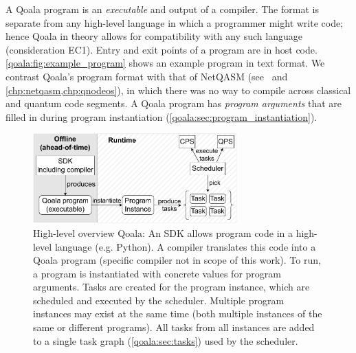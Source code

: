 A Qoala program is an \textit{executable} and output of a compiler.
The format is separate from any high-level language in which a programmer might write code; hence Qoala in theory allows for compatibility with any such language (consideration EC1).
Entry and exit points of a program are in host code.
\cref{qoala:fig:example_program} shows an example program in text format.
We contrast Qoala's program format with that of NetQASM (see~\cite{dahlberg2022netqasm} and \cref{chp:netqasm,chp:qnodeos}), in which there was no way to compile across classical and quantum code segments.
A Qoala program has \textit{program arguments} that are filled in during program instantiation (\cref{qoala:sec:program_instantiation}).


\begin{figure}
    \centering
    \includegraphics[width=0.7\textwidth]{figures/qoala/runtime_overview.pdf}
    \caption{High-level overview Qoala: An SDK allows program code in a high-level language (e.g. Python).
    A compiler translates this code into a Qoala program (specific compiler not in scope of this work).
    To run, a program is instantiated with concrete values for program arguments.
    Tasks are created for the program instance, which are scheduled and executed by the scheduler.
    Multiple program instances may exist at the same time (both multiple instances of the same or different programs).
    All tasks from all instances are added to a single task graph (\cref{qoala:sec:tasks}) used by the scheduler.
    }
    \label{qoala:fig:runtime_overview}
\end{figure}




